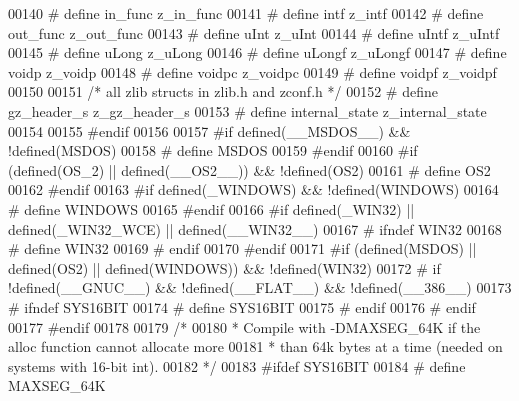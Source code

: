 \begin{DoxyCode}
00140 \textcolor{preprocessor}{#  define in\_func               z\_in\_func}
00141 \textcolor{preprocessor}{#  define intf                  z\_intf}
00142 \textcolor{preprocessor}{#  define out\_func              z\_out\_func}
00143 \textcolor{preprocessor}{#  define uInt                  z\_uInt}
00144 \textcolor{preprocessor}{#  define uIntf                 z\_uIntf}
00145 \textcolor{preprocessor}{#  define uLong                 z\_uLong}
00146 \textcolor{preprocessor}{#  define uLongf                z\_uLongf}
00147 \textcolor{preprocessor}{#  define voidp                 z\_voidp}
00148 \textcolor{preprocessor}{#  define voidpc                z\_voidpc}
00149 \textcolor{preprocessor}{#  define voidpf                z\_voidpf}
00150 
00151 \textcolor{comment}{/* all zlib structs in zlib.h and zconf.h */}
00152 \textcolor{preprocessor}{#  define gz\_header\_s           z\_gz\_header\_s}
00153 \textcolor{preprocessor}{#  define internal\_state        z\_internal\_state}
00154 
00155 \textcolor{preprocessor}{#endif}
00156 
00157 \textcolor{preprocessor}{#if defined(\_\_MSDOS\_\_) && !defined(MSDOS)}
00158 \textcolor{preprocessor}{#  define MSDOS}
00159 \textcolor{preprocessor}{#endif}
00160 \textcolor{preprocessor}{#if (defined(OS\_2) || defined(\_\_OS2\_\_)) && !defined(OS2)}
00161 \textcolor{preprocessor}{#  define OS2}
00162 \textcolor{preprocessor}{#endif}
00163 \textcolor{preprocessor}{#if defined(\_WINDOWS) && !defined(WINDOWS)}
00164 \textcolor{preprocessor}{#  define WINDOWS}
00165 \textcolor{preprocessor}{#endif}
00166 \textcolor{preprocessor}{#if defined(\_WIN32) || defined(\_WIN32\_WCE) || defined(\_\_WIN32\_\_)}
00167 \textcolor{preprocessor}{#  ifndef WIN32}
00168 \textcolor{preprocessor}{#    define WIN32}
00169 \textcolor{preprocessor}{#  endif}
00170 \textcolor{preprocessor}{#endif}
00171 \textcolor{preprocessor}{#if (defined(MSDOS) || defined(OS2) || defined(WINDOWS)) && !defined(WIN32)}
00172 \textcolor{preprocessor}{#  if !defined(\_\_GNUC\_\_) && !defined(\_\_FLAT\_\_) && !defined(\_\_386\_\_)}
00173 \textcolor{preprocessor}{#    ifndef SYS16BIT}
00174 \textcolor{preprocessor}{#      define SYS16BIT}
00175 \textcolor{preprocessor}{#    endif}
00176 \textcolor{preprocessor}{#  endif}
00177 \textcolor{preprocessor}{#endif}
00178 
00179 \textcolor{comment}{/*}
00180 \textcolor{comment}{ * Compile with -DMAXSEG\_64K if the alloc function cannot allocate more}
00181 \textcolor{comment}{ * than 64k bytes at a time (needed on systems with 16-bit int).}
00182 \textcolor{comment}{ */}
00183 \textcolor{preprocessor}{#ifdef SYS16BIT}
00184 \textcolor{preprocessor}{#  define MAXSEG\_64K}

\end{DoxyCode}
